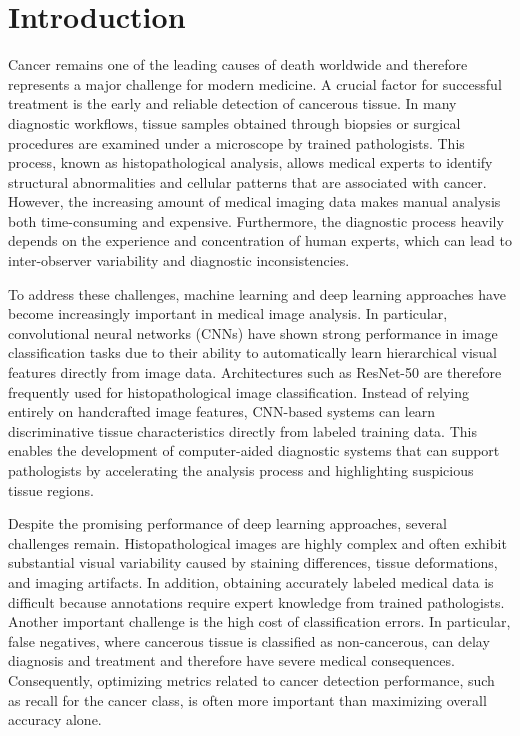 \section{Introduction}
Cancer remains one of the leading causes of death worldwide and therefore
represents a major challenge for modern medicine. A crucial factor for
successful treatment is the early and reliable detection of cancerous tissue.
In many diagnostic workflows, tissue samples obtained through biopsies or
surgical procedures are examined under a microscope by trained pathologists.
This process, known as histopathological analysis, allows medical experts to
identify structural abnormalities and cellular patterns that are associated with
cancer. However, the increasing amount of medical imaging data makes manual
analysis both time-consuming and expensive. Furthermore, the diagnostic process
heavily depends on the experience and concentration of human experts, which can
lead to inter-observer variability and diagnostic inconsistencies.

To address these challenges, machine learning and deep learning approaches have
become increasingly important in medical image analysis. In particular,
convolutional neural networks (CNNs) have shown strong performance in image
classification tasks due to their ability to automatically learn hierarchical
visual features directly from image data. Architectures such as ResNet-50 are
therefore frequently used for histopathological image classification. Instead of
relying entirely on handcrafted image features, CNN-based systems can learn
discriminative tissue characteristics directly from labeled training data. This
enables the development of computer-aided diagnostic systems that can support
pathologists by accelerating the analysis process and highlighting suspicious
tissue regions.

Despite the promising performance of deep learning approaches, several
challenges remain. Histopathological images are highly complex and often exhibit
substantial visual variability caused by staining differences, tissue
deformations, and imaging artifacts. In addition, obtaining accurately labeled
medical data is difficult because annotations require expert knowledge from
trained pathologists. Another important challenge is the high cost of
classification errors. In particular, false negatives, where cancerous tissue is
classified as non-cancerous, can delay diagnosis and treatment and therefore
have severe medical consequences. Consequently, optimizing metrics related to
cancer detection performance, such as recall for the cancer class, is often more
important than maximizing overall accuracy alone.

